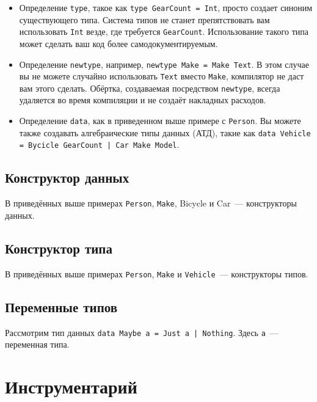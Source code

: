 \begin{itemize}
  \item Определение \lstinline'type', такое как \lstinline'type GearCount = Int', просто создает синоним существующего типа. Система типов не станет препятствовать вам использовать \lstinline'Int' везде, где требуется \lstinline'GearCount'. Использование такого типа может сделать ваш код более самодокументируемым.
  \item Определение \lstinline'newtype', например, \lstinline'newtype Make = Make Text'. В этом случае вы не можете случайно использовать \lstinline'Text' вместо \lstinline'Make', компилятор не даст вам этого сделать. Обёртка, создаваемая посредством \lstinline'newtype', всегда удаляется во время компиляции и не создаёт накладных расходов.
  \item Определение \lstinline'data', как в приведенном выше примере с \lstinline'Person'. Вы можете также создавать алгебраические типы данных (АТД), такие как \lstinline'data Vehicle = Bycicle GearCount | Car Make Model'.
\end{itemize}

\subsection{Конструктор данных}

В приведённых выше примерах \lstinline'Person', \lstinline'Make', Bicycle и Car~--- конструкторы данных.

\subsection{Конструктор типа}

В приведённых выше примерах \lstinline'Person', \lstinline'Make' и \lstinline'Vehicle'~--- конструкторы типов.

\subsection{Переменные типов}

Рассмотрим тип данных \lstinline'data Maybe a = Just a | Nothing'. Здесь \lstinline'a'~--- переменная типа.

\section{Инструментарий}

